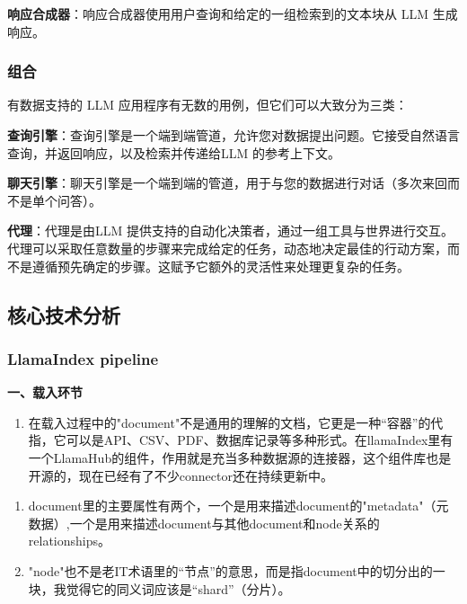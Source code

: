 \documentclass[
]{article}
\begin{document}
\textbf{响应合成器}：响应合成器使用用户查询和给定的一组检索到的文本块从
LLM 生成响应。

\subsubsection{组合}\label{ux7ec4ux5408}

有数据支持的 LLM 应用程序有无数的用例，但它们可以大致分为三类：

\textbf{查询引擎}：查询引擎是一个端到端管道，允许您对数据提出问题。它接受自然语言查询，并返回响应，以及检索并传递给LLM
的参考上下文。

\textbf{聊天引擎}：聊天引擎是一个端到端的管道，用于与您的数据进行对话（多次来回而不是单个问答）。

\textbf{代理}：代理是由LLM
提供支持的自动化决策者，通过一组工具与世界进行交互。代理可以采取任意数量的步骤来完成给定的任务，动态地决定最佳的行动方案，而不是遵循预先确定的步骤。这赋予它额外的灵活性来处理更复杂的任务。

\subsection{核心技术分析}\label{ux6838ux5fc3ux6280ux672fux5206ux6790}

\subsubsection{LlamaIndex pipeline}\label{llamaindex-pipeline}

\textbf{一、载入环节}

\begin{enumerate}
\def\labelenumi{\arabic{enumi}.}
\item
  在载入过程中的"document"不是通用的理解的文档，它更是一种``容器''的代指，它可以是API、CSV、PDF、数据库记录等多种形式。在llamaIndex里有一个LlamaHub的组件，作用就是充当多种数据源的连接器，这个组件库也是开源的，现在已经有了不少connector还在持续更新中。
\end{enumerate}

\begin{enumerate}
\def\labelenumi{\arabic{enumi}.}
\item
  document里的主要属性有两个，一个是用来描述document的"metadata"（元数据）,一个是用来描述document与其他document和node关系的relationships。
\item
  "node"也不是老IT术语里的``节点''的意思，而是指document中的切分出的一块，我觉得它的同义词应该是``shard''（分片）。
\end{enumerate}
\end{document}
